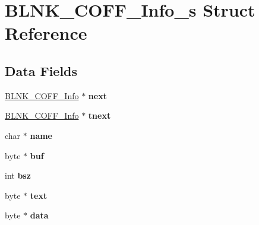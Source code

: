 \hypertarget{structBLNK__COFF__Info__s}{\section{B\-L\-N\-K\-\_\-\-C\-O\-F\-F\-\_\-\-Info\-\_\-s Struct Reference}
\label{structBLNK__COFF__Info__s}
}
\subsection*{Data Fields}
\begin{DoxyCompactItemize}
\item 
\hypertarget{structBLNK__COFF__Info__s_ae38ed74ba581eec6377c5ab3ea7f9b1e}{\hyperlink{structBLNK__COFF__Info__s}{B\-L\-N\-K\-\_\-\-C\-O\-F\-F\-\_\-\-Info} $\ast$ {\bfseries next}}\label{structBLNK__COFF__Info__s_ae38ed74ba581eec6377c5ab3ea7f9b1e}

\item 
\hypertarget{structBLNK__COFF__Info__s_ad3ec5ba6f0674b3f120203967313df16}{\hyperlink{structBLNK__COFF__Info__s}{B\-L\-N\-K\-\_\-\-C\-O\-F\-F\-\_\-\-Info} $\ast$ {\bfseries tnext}}\label{structBLNK__COFF__Info__s_ad3ec5ba6f0674b3f120203967313df16}

\item 
\hypertarget{structBLNK__COFF__Info__s_ab7c79b84f566b68a52cf0b20fae610cb}{char $\ast$ {\bfseries name}}\label{structBLNK__COFF__Info__s_ab7c79b84f566b68a52cf0b20fae610cb}

\item 
\hypertarget{structBLNK__COFF__Info__s_a6012bb9c382751304548575e619f91ef}{byte $\ast$ {\bfseries buf}}\label{structBLNK__COFF__Info__s_a6012bb9c382751304548575e619f91ef}

\item 
\hypertarget{structBLNK__COFF__Info__s_a0869027a2f00d24b296d2fc0e41963ef}{int {\bfseries bsz}}\label{structBLNK__COFF__Info__s_a0869027a2f00d24b296d2fc0e41963ef}

\item 
\hypertarget{structBLNK__COFF__Info__s_ab04bdcc9973a5fb87c479f701b51d049}{byte $\ast$ {\bfseries text}}\label{structBLNK__COFF__Info__s_ab04bdcc9973a5fb87c479f701b51d049}

\item 
\hypertarget{structBLNK__COFF__Info__s_a35c019a38d21ec385aa02f4374fc5f7c}{byte $\ast$ {\bfseries data}}\label{structBLNK__COFF__Info__s_a35c019a38d21ec385aa02f4374fc5f7c}


\end{DoxyCompactItemize}
